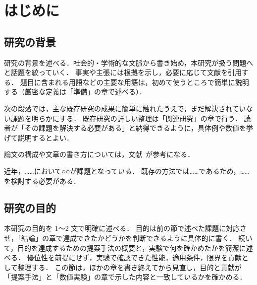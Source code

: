 \chapter{はじめに}
\label{chap:introduction}

\section{研究の背景}
\label{sec:background}

\begin{writingnote}
研究の背景を述べる．社会的・学術的な文脈から書き始め，本研究が扱う問題へと話題を絞っていく．
事実や主張には根拠を示し，必要に応じて文献を引用する．
題目に含まれる用語などの主要な用語は，初めて使うところで簡単に説明する（厳密な定義は「準備」の章で述べる）．

次の段落では，主な既存研究の成果に簡単に触れたうえで，まだ解決されていない課題を明らかにする．
既存研究の詳しい整理は「関連研究」の章で行う．
読者が「その課題を解決する必要がある」と納得できるように，具体例や数値を挙げて説明するとよい．

論文の構成や文章の書き方については，文献~\cite{kinoshita1981rikakei,sakai2015kore}が参考になる．
\end{writingnote}

近年，……において○○が課題となっている．
既存の方法では……であるため，……を検討する必要がある．

\section{研究の目的}
\label{sec:purpose}

\begin{writingnote}
本研究の目的を 1〜2 文で明確に述べる．
目的は前の節で述べた課題に対応させ，「結論」の章で達成できたかどうかを判断できるように具体的に書く．
続いて，目的を達成するための提案手法の概要と，実験で何を確かめたかを簡潔に述べる．
優位性を前提にせず，実験で確認できた性能，適用条件，限界を貢献として整理する．
この節は，ほかの章を書き終えてから見直し，目的と貢献が「提案手法」と「数値実験」の章で示した内容と一致しているかを確かめる．
\end{writingnote}

